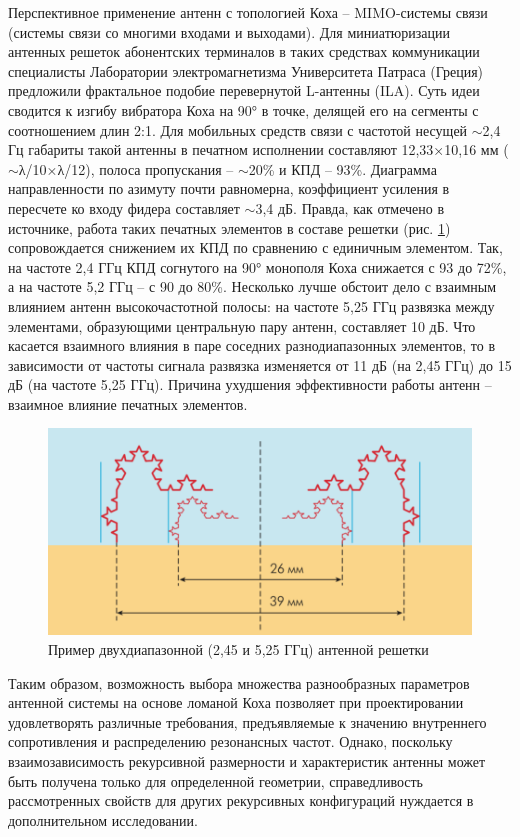 Перспективное применение антенн с топологией Коха – MIMO-системы связи (системы связи со многими входами и выходами). Для миниатюризации антенных решеток абонентских терминалов в таких средствах коммуникации специалисты Лаборатории электромагнетизма Университета Патраса (Греция) предложили фрактальное подобие перевернутой L-антенны (ILA). Суть идеи сводится к изгибу вибратора Коха на 90° в точке, делящей его на сегменты с соотношением длин 2:1. Для мобильных средств связи с частотой несущей $\sim$2,4 Гц габариты такой антенны в печатном исполнении составляют 12,33×10,16 мм ($\sim$λ/10×λ/12), полоса пропускания – $\sim$20\% и КПД – 93\%. Диаграмма направленности по азимуту почти равномерна, коэффициент усиления в пересчете ко входу фидера составляет $\sim$3,4 дБ. Правда, как отмечено в источнике, работа таких печатных элементов в составе решетки (рис. \ref{fig:two-d}) сопровождается снижением их КПД по сравнению с единичным элементом. Так, на частоте 2,4 ГГц КПД согнутого на 90° монополя Коха снижается с 93 до 72\%, а на частоте 5,2 ГГц – с 90 до 80\%. Несколько лучше обстоит дело с взаимным влиянием антенн высокочастотной полосы: на частоте 5,25 ГГц развязка между элементами, образующими центральную пару антенн, составляет 10 дБ. Что касается взаимного влияния в паре соседних разнодиапазонных элементов, то в зависимости от частоты сигнала развязка изменяется от 11 дБ (на 2,45 ГГц) до 15 дБ (на частоте 5,25 ГГц). Причина ухудшения эффективности работы антенн – взаимное влияние печатных элементов.

\begin{figure}[H]
    \centering
    \includegraphics[width=.9\textwidth]{img/two-d.png}
    \caption{Пример двухдиапазонной (2,45 и 5,25 ГГц) антенной решетки}
    \label{fig:two-d}
\end{figure}


Таким образом, возможность выбора множества разнообразных параметров антенной системы на основе ломаной Коха позволяет при проектировании удовлетворять различные требования, предъявляемые к значению внутреннего сопротивления и распределению резонансных частот. Однако, поскольку взаимозависимость рекурсивной размерности и характеристик антенны может быть получена только для определенной геометрии, справедливость рассмотренных свойств для других рекурсивных конфигураций нуждается в дополнительном исследовании.



